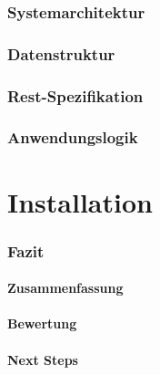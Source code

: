 \documentclass[a4paper,11pt]{article}%
\renewcommand{\\}{\vspace*{0.5\baselineskip} \newline}
\begin{document}
\section{Systemarchitektur}

\section{Datenstruktur}

\section{Rest-Spezifikation}

\section{Anwendungslogik}

\newpage
\vspace*{\fill}
\part{Installation}
\vfill
\newpage

\section{Fazit}

\subsection{Zusammenfassung}

\subsection{Bewertung}

\subsection{Next Steps}

\newpage
\end{document}
